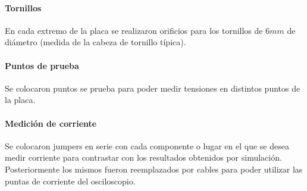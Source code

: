 \paragraph{Tornillos}

En cada extremo de la placa se realizaron orificios para los tornillos de $6mm$ de diámetro (medida de la cabeza de tornillo típica). 

\paragraph{Puntos de prueba}

Se colocaron puntos se prueba para poder medir tensiones en distintos puntos de la placa.

\paragraph{Medición de corriente} 

Se colocaron jumpers en serie con cada componente o lugar
en el que se desea medir corriente para contrastar con los resultados obtenidos por simulación.
Posteriormente los mismos fueron reemplazados por cables
para poder utilizar las puntas de corriente del osciloscopio.
